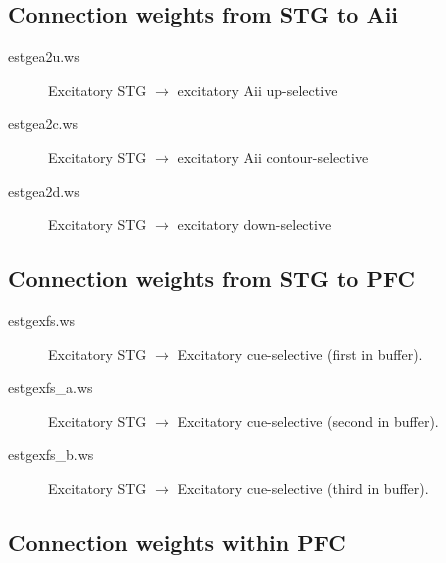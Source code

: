 \documentclass[12pt]{article}
\begin{document}
\subsection{Connection weights from STG to Aii}
\begin{description}
  \item[estgea2u.ws] Excitatory STG $\rightarrow$ 
                     excitatory Aii up-selective
  \item[estgea2c.ws] Excitatory STG $\rightarrow$ 
                     excitatory Aii contour-selective 
  \item[estgea2d.ws] Excitatory STG $\rightarrow$
                     excitatory down-selective
\end{description}

\subsection{Connection weights from STG to PFC}
\begin{description}
  \item[estgexfs.ws] Excitatory STG $\rightarrow$ 
                     Excitatory cue-selective (first in buffer).
  \item[estgexfs\_a.ws] Excitatory STG $\rightarrow$ 
                     Excitatory cue-selective (second in buffer). 
  \item[estgexfs\_b.ws] Excitatory STG $\rightarrow$ 
                     Excitatory cue-selective (third in buffer).
\end{description}

\subsection{Connection weights within PFC}
\end{document}
